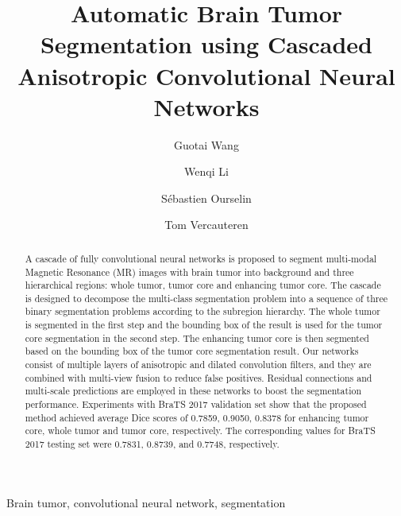 \documentclass[a4paper,orivec,runningheads]{llncs}
\begin{document}



\title{Automatic Brain Tumor Segmentation using Cascaded Anisotropic Convolutional Neural Networks}

  \author{Guotai Wang \and Wenqi Li \and  S\'ebastien Ourselin \and Tom Vercauteren}

\maketitle              

\begin{abstract}
A cascade of fully convolutional neural networks is proposed to segment multi-modal Magnetic Resonance (MR) images with brain tumor into background and three hierarchical regions: whole tumor, tumor core and enhancing tumor core.  The cascade is designed to decompose the multi-class segmentation problem into a sequence of three binary segmentation problems according to the subregion hierarchy. The whole tumor is segmented in the first step and the bounding box of the result is used for the tumor core segmentation in the second step. The enhancing tumor core is then segmented based on the bounding box of the tumor core segmentation result. Our networks consist of multiple layers of anisotropic and dilated convolution filters, and they are combined with multi-view fusion to reduce false positives.  Residual connections and multi-scale predictions are employed in these networks to boost the segmentation performance. Experiments with BraTS 2017 validation set show that the proposed method achieved average Dice scores of 0.7859, 0.9050, 0.8378 for enhancing tumor core, whole tumor and tumor core, respectively. The corresponding values for BraTS 2017 testing set were 0.7831, 0.8739, and 0.7748, respectively. 
\end{abstract}

\begin{keywords}
Brain tumor, convolutional neural network, segmentation
\end{keywords}
\end{document}
